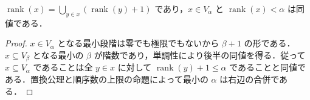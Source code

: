 \begin{prop}[階数の再帰式]
$\operatorname{rank}(x)=\bigcup_{y\in x}(\operatorname{rank}(y)+1)$ であり，$x\in V_\alpha$ と $\operatorname{rank}(x)<\alpha$ は同値である．
\end{prop}
\begin{proof}
$x\in V_\alpha$ となる最小段階は零でも極限でもないから $\beta+1$ の形である．$x\subseteq V_\beta$ となる最小の $\beta$ が階数であり，単調性により後半の同値を得る．従って $x\subseteq V_\alpha$ であることは全 $y\in x$ に対して $\operatorname{rank}(y)+1\leq\alpha$ であることと同値である．置換公理と順序数の上限の命題によって最小の $\alpha$ は右辺の合併である．
\end{proof}
